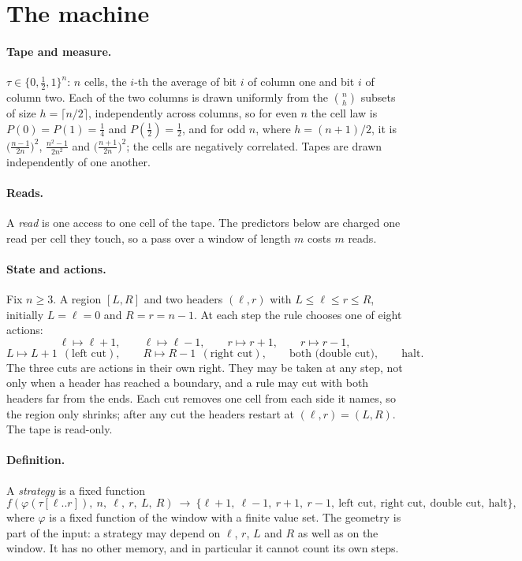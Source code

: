 \documentclass[11pt]{article}
\begin{document}
\section{The machine}\label{sec:machine}

\paragraph{Tape and measure.} $\tau\in\{0,\tfrac12,1\}^n$: $n$ cells, the $i$-th the average of bit $i$ of column one and bit $i$ of column two.
Each of the two columns is drawn uniformly from the $\binom nh$ subsets of size $h=\lceil n/2\rceil$,
independently across columns, so for even $n$ the cell law is $P(0)=P(1)=\tfrac14$ and
$P(\tfrac12)=\tfrac12$, and for odd $n$, where $h=(n+1)/2$, it is
$\big(\frac{n-1}{2n}\big)^2$, $\frac{n^2-1}{2n^2}$ and $\big(\frac{n+1}{2n}\big)^2$; the cells are
negatively correlated. Tapes are drawn independently of one another.

\paragraph{Reads.} A \emph{read} is one access to one cell of the tape. The predictors below are
charged one read per cell they touch, so a pass over a window of length $m$ costs $m$ reads.

\paragraph{State and actions.} Fix $n\ge3$. A region $[L,R]$ and two headers $(\ell,r)$ with
$L\le\ell\le r\le R$, initially $L=\ell=0$ and $R=r=n-1$. At each step the rule chooses one of eight
actions:
\[
\ell\mapsto\ell+1,\qquad \ell\mapsto\ell-1,\qquad r\mapsto r+1,\qquad r\mapsto r-1,
\]
\[
L\mapsto L+1\ \ (\text{left cut}),\qquad R\mapsto R-1\ \ (\text{right cut}),\qquad
\text{both (double cut)},\qquad \text{halt}.
\]
The three cuts are actions in their own right. They may be taken at any step, not only
when a header has reached a boundary, and a rule may cut with both headers far from the ends.
Each cut removes one cell from each side it names, so the region only shrinks; after any cut the
headers restart at $(\ell,r)=(L,R)$. The tape is read-only.

\paragraph{Definition.} A \emph{strategy} is a fixed function
\[
f(\varphi(\tau[\ell..r]),\ n,\ \ell,\ r,\ L,\ R)\ \longrightarrow\
\{\ell{+}1,\ \ell{-}1,\ r{+}1,\ r{-}1,\ \text{left cut},\ \text{right cut},\ \text{double cut},\ \text{halt}\},
\]
where $\varphi$ is a fixed function of the window with a finite value set. The geometry is part of the
input: a strategy may depend on $\ell$, $r$, $L$ and $R$ as well as on the window. It has no other
memory, and in particular it cannot count its own steps.
\end{document}
